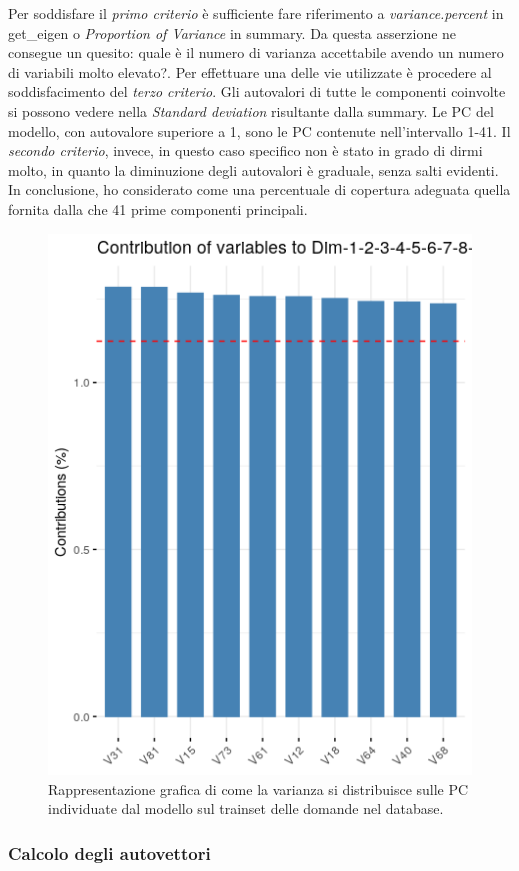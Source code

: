 \noindent
Per soddisfare il \textit{primo criterio} \`e sufficiente fare riferimento a \textit{variance.percent} in get\_eigen o \textit{Proportion of Variance} in summary. Da questa asserzione ne consegue un quesito: quale \`e il numero di varianza accettabile avendo un numero di variabili molto elevato?.
Per effettuare una delle vie utilizzate \`e procedere al soddisfacimento del \textit{terzo criterio}. Gli autovalori di tutte le componenti coinvolte si possono vedere nella \textit{Standard deviation} risultante dalla summary. Le PC del modello, con autovalore superiore a 1, sono le PC contenute nell'intervallo 1-41.
Il \textit{secondo criterio}, invece, in questo caso specifico non \`e stato in grado di dirmi molto,  in quanto la diminuzione degli autovalori \`e graduale, senza salti evidenti.\\
In conclusione, ho considerato come una percentuale di copertura adeguata quella fornita dalla che 41 prime componenti principali.
\begin{figure}[H]
\centering
	\includegraphics[width=0.60\linewidth]{../../PCA/plot/varianza-complessiva_rete-db.png}
	\caption{Rappresentazione grafica di come la varianza si distribuisce sulle PC individuate dal modello sul trainset delle domande nel database.}
	\label{Rappresentazione grafica di come la varianza si distribuisce sulle PC individuate dal modello sul trainset delle domande nel database.}
\end{figure}

\subsubsection{Calcolo degli autovettori}
\label{Calcolo degli autovettori}

